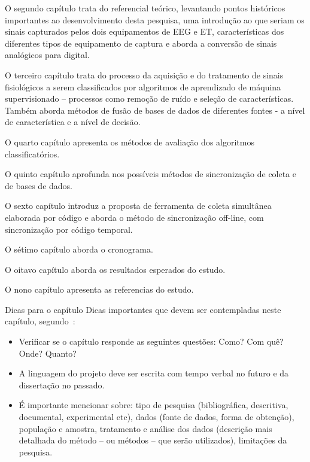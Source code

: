 \documentclass[a4paper, 12pt]{ppgeb}
\makeatletter
\renewcommand{\section}{\@startsection
{section}
{1}
{0mm}
{-\baselineskip}
{0.5\baselineskip}
{\large\bfseries\scshape}}
\makeatother
\begin{document}
O segundo capítulo trata do referencial teórico, levantando pontos históricos importantes ao desenvolvimento desta pesquisa, uma introdução ao que seriam os sinais capturados pelos dois equipamentos de EEG e ET, características dos diferentes tipos de equipamento de captura e aborda a conversão de sinais analógicos para digital. 

O terceiro capítulo trata do processo da aquisição e do tratamento de sinais fisiológicos a serem classificados por algoritmos de aprendizado de máquina supervisionado – processos como remoção de ruído e seleção de características. Também aborda métodos de fusão de bases de dados de diferentes fontes - a nível de característica e a nível de decisão. 

O quarto capítulo apresenta os métodos de avaliação dos algoritmos classificatórios. 

O quinto capítulo aprofunda nos possíveis métodos de sincronização de coleta e de bases de dados.

O sexto capítulo introduz a proposta de ferramenta de coleta simultânea elaborada por código e aborda o método de sincronização off-line, com sincronização por código temporal. 

O sétimo capítulo aborda o cronograma.

O oitavo capítulo aborda os resultados esperados do estudo.


O nono capítulo apresenta as referencias do estudo.















\section{Dicas para o capítulo}
Dicas importantes que devem ser contempladas neste capítulo, segundo~\cite{marconi.lakatos:2003}:
\begin{itemize}
\item Verificar se o capítulo responde as seguintes questões: Como? Com quê? Onde? Quanto?
\item A linguagem do projeto deve ser escrita com tempo verbal no futuro e da dissertação no passado.
\item É importante mencionar sobre: tipo de pesquisa (bibliográfica, descritiva, documental, experimental etc), dados (fonte de dados, forma de obtenção), população e amostra, tratamento e análise dos dados (descrição mais detalhada do método -- ou métodos -- que serão utilizados), limitações da pesquisa.
\end{itemize}
\end{document}
